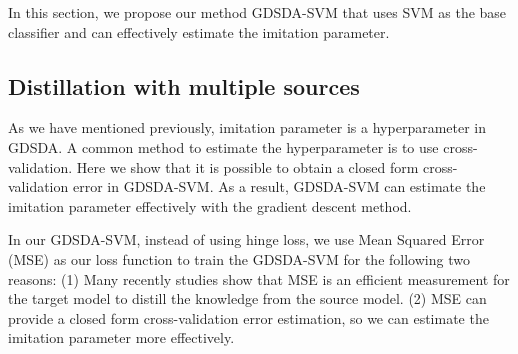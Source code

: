 In this section, we propose our method GDSDA-SVM that uses SVM as the base classifier and can effectively estimate the imitation parameter.
\subsection{Distillation with multiple sources}
As we have mentioned previously, imitation parameter is a hyperparameter in GDSDA. A common method to estimate the hyperparameter is to use cross-validation.
Here we show that it is possible to obtain a closed form cross-validation error\cite{cawley2006leave} in GDSDA-SVM.
As a result,  GDSDA-SVM can estimate the imitation parameter effectively with the gradient descent method.

In our GDSDA-SVM, instead of using hinge loss, we use Mean Squared Error (MSE) as our loss function to train the GDSDA-SVM for the following two reasons: (1) Many recently studies \cite{ba2014deep,luo2016face,romero2014fitnets,urban2016deep} show that MSE is an efficient measurement for the target model to distill the knowledge from the source model. (2) MSE can provide a closed form cross-validation error estimation, so we can estimate the imitation parameter more effectively. 


